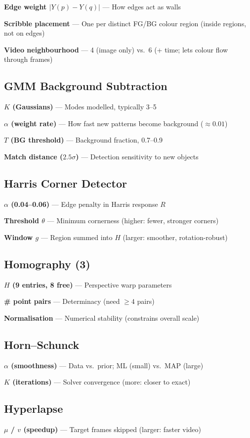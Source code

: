 \documentclass[10pt]{article}
\begin{document}
\textbf{Edge weight $|Y(p)-Y(q)|$} --- How edges act as walls

\textbf{Scribble placement} --- One per distinct FG/BG colour region (inside regions, not on edges)

\textbf{Video neighbourhood} --- 4 (image only) vs.\ 6 (+ time; lets colour flow through frames)

\subsection*{GMM Background Subtraction}
\textbf{$K$ (Gaussians)} --- Modes modelled, typically 3--5

\textbf{$\alpha$ (weight rate)} --- How fast new patterns become background ($\approx0.01$)

\textbf{$T$ (BG threshold)} --- Background fraction, 0.7--0.9

\textbf{Match distance ($2.5\sigma$)} --- Detection sensitivity to new objects

\subsection*{Harris Corner Detector}
\textbf{$\alpha$ (0.04--0.06)} --- Edge penalty in Harris response $R$

\textbf{Threshold $\theta$} --- Minimum cornerness (higher: fewer, stronger corners)

\textbf{Window $g$} --- Region summed into $H$ (larger: smoother, rotation-robust)

\subsection*{Homography (3)}
\textbf{$H$ (9 entries, 8 free)} --- Perspective warp parameters

\textbf{\# point pairs} --- Determinacy (need $\ge4$ pairs)

\textbf{Normalisation} --- Numerical stability (constrains overall scale)

\subsection*{Horn--Schunck}
\textbf{$\alpha$ (smoothness)} --- Data vs.\ prior; ML (small) vs.\ MAP (large)

\textbf{$K$ (iterations)} --- Solver convergence (more: closer to exact)

\subsection*{Hyperlapse}
\textbf{$\mu$ / $v$ (speedup)} --- Target frames skipped (larger: faster video)
\end{document}

